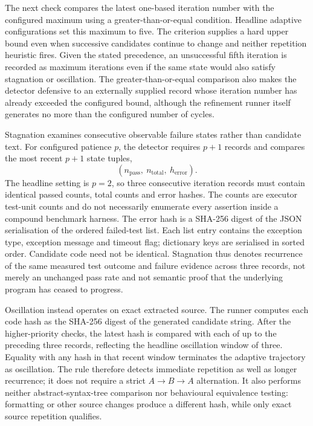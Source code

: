 The next check compares the latest one-based iteration number with the configured maximum using a greater-than-or-equal condition. Headline adaptive configurations set this maximum to five. The criterion supplies a hard upper bound even when successive candidates continue to change and neither repetition heuristic fires. Given the stated precedence, an unsuccessful fifth iteration is recorded as maximum iterations even if the same state would also satisfy stagnation or oscillation. The greater-than-or-equal comparison also makes the detector defensive to an externally supplied record whose iteration number has already exceeded the configured bound, although the refinement runner itself generates no more than the configured number of cycles.

Stagnation examines consecutive observable failure states rather than candidate text. For configured patience $p$, the detector requires $p+1$ records and compares the most recent $p+1$ state tuples,
\[
    (n_{\mathrm{pass}},\ n_{\mathrm{total}},\ h_{\mathrm{error}}).
\]
The headline setting is $p=2$, so three consecutive iteration records must contain identical passed counts, total counts and error hashes. The counts are executor test-unit counts and do not necessarily enumerate every assertion inside a compound benchmark harness. The error hash is a SHA-256 digest of the JSON serialisation of the ordered failed-test list. Each list entry contains the exception type, exception message and timeout flag; dictionary keys are serialised in sorted order. Candidate code need not be identical. Stagnation thus denotes recurrence of the same measured test outcome and failure evidence across three records, not merely an unchanged pass rate and not semantic proof that the underlying program has ceased to progress.

Oscillation instead operates on exact extracted source. The runner computes each code hash as the SHA-256 digest of the generated candidate string. After the higher-priority checks, the latest hash is compared with each of up to the preceding three records, reflecting the headline oscillation window of three. Equality with any hash in that recent window terminates the adaptive trajectory as oscillation. The rule therefore detects immediate repetition as well as longer recurrence; it does not require a strict $A\rightarrow B\rightarrow A$ alternation. It also performs neither abstract-syntax-tree comparison nor behavioural equivalence testing: formatting or other source changes produce a different hash, while only exact source repetition qualifies.


